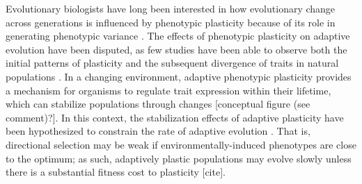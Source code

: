 Evolutionary biologists have long been interested in how evolutionary change across generations is influenced by phenotypic plasticity because of its role in generating phenotypic variance \citep{gibert_phenotypic_2019}.
The effects of phenotypic plasticity on adaptive evolution have been disputed, as few studies have been able to observe both the initial patterns of plasticity and the subsequent divergence of traits in natural populations \citep{ghalambor_adaptive_2007,wund_assessing_2012,forsman_rethinking_2015,ghalambor_non-adaptive_2015,hendry_key_2016}.
In a changing environment, adaptive phenotypic plasticity provides a mechanism for organisms to regulate trait expression within their lifetime, which can stabilize populations through changes \citep{gibert_phenotypic_2019} [conceptual figure (see comment)?].
In this context, the stabilization effects of adaptive plasticity have been hypothesized to constrain the rate of adaptive evolution \citep{gupta_study_1982,ancel_undermining_2000,huey_behavioral_2003,price_role_2003,paenke_influence_2007}.
That is, directional selection may be weak if environmentally-induced phenotypes are close to the optimum; as such, adaptively plastic populations may evolve slowly unless there is a substantial fitness cost to plasticity [cite].

